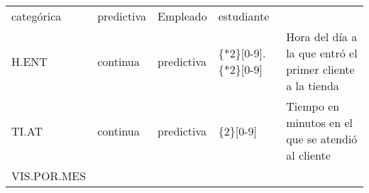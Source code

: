 \documentclass[]{book}
\begin{document}
\begin{longtable}[]{@{}lllll@{}}
\begin{minipage}[t]{0.06\columnwidth}
categórica\strut
\end{minipage} & \begin{minipage}[t]{0.06\columnwidth}\raggedright\strut
predictiva\strut
\end{minipage} & \begin{minipage}[t]{0.42\columnwidth}\raggedright\strut
Empleado\strut
\end{minipage} & \begin{minipage}[t]{0.27\columnwidth}\raggedright\strut
estudiante\strut
\end{minipage}\tabularnewline
\begin{minipage}[t]{0.06\columnwidth}\raggedright\strut
H.ENT\strut
\end{minipage} & \begin{minipage}[t]{0.06\columnwidth}\raggedright\strut
continua\strut
\end{minipage} & \begin{minipage}[t]{0.06\columnwidth}\raggedright\strut
predictiva\strut
\end{minipage} & \begin{minipage}[t]{0.42\columnwidth}\raggedright\strut
\{*2\}{[}0-9{]}.\{*2\}{[}0-9{]}\strut
\end{minipage} & \begin{minipage}[t]{0.27\columnwidth}\raggedright\strut
Hora del día a la que entró el primer cliente a la tienda\strut
\end{minipage}\tabularnewline
\begin{minipage}[t]{0.06\columnwidth}\raggedright\strut
TI.AT\strut
\end{minipage} & \begin{minipage}[t]{0.06\columnwidth}\raggedright\strut
continua\strut
\end{minipage} & \begin{minipage}[t]{0.06\columnwidth}\raggedright\strut
predictiva\strut
\end{minipage} & \begin{minipage}[t]{0.42\columnwidth}\raggedright\strut
\{2\}{[}0-9{]}\strut
\end{minipage} & \begin{minipage}[t]{0.27\columnwidth}\raggedright\strut
Tiempo en minutos en el que se atendió al cliente\strut
\end{minipage}\tabularnewline
\begin{minipage}[t]{0.06\columnwidth}\raggedright\strut
VIS.POR.MES\strut
\end{minipage} & \begin{minipage}[t]{0.06\columnwidth}\raggedright\strut

\end{minipage}
\end{longtable}
\end{document}
